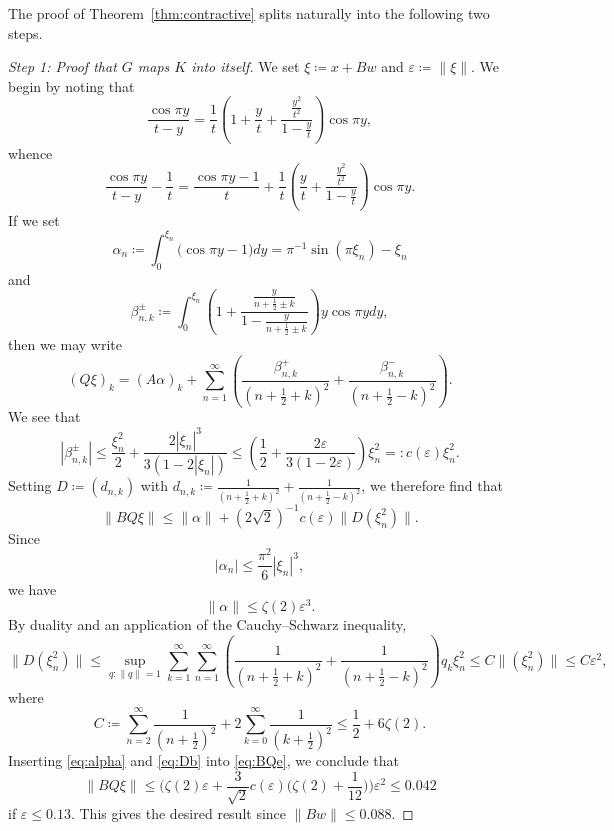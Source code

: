 \documentclass[12pt]{amsart}
\theoremstyle{plain}
\begin{document}
The proof of Theorem~\ref{thm:contractive} splits naturally into the following two steps. 
\begin{proof}[Step 1: Proof that $G$ maps $K$ into itself]
 We set $\xi\coloneqq x+Bw$ and $\varepsilon\coloneqq \|\xi\|$. We begin by noting that
\[ \frac{\cos\pi y}{t-y}=\frac{1}{t}\left(1+\frac{y}{t}+\frac{\frac{y^2}{t^2}}{1-\frac{y}{t}}\right)\cos\pi y, \]
whence
\[\frac{\cos\pi y}{t-y}-\frac{1}{t}=\frac{\cos \pi y-1}{t}+\frac{1}{t}\left(\frac{y}{t}+\frac{\frac{y^2}{t^2}}{1-\frac{y}{t}}\right)\cos\pi y. \]
If we set
\begin{equation}  \alpha_n\coloneqq \int_0^{\xi_n} \big(\cos \pi y-1\big) dy = 
\pi^{-1}\sin (\pi \xi_n)-\xi_n \end{equation}
and 
\[ \beta_{n,k}^{\pm}\coloneqq  \int_{0}^{\xi_n} \left(1+\frac{\frac{y}{n+\frac12\pm k}}{1-\frac{y}{n+\frac12\pm k}}\right)y\cos\pi y dy ,\] 
then we may write
\[ (Q\xi)_k = (A\alpha)_k + \sum_{n=1}^\infty \left(\frac{\beta_{n,k}^{+}}{(n+\frac12+k)^2} +\frac{\beta^{-}_{n,k}}{(n+\frac12-k)^2}\right). \]
We see that
\[ |\beta_{n,k}^{\pm}|\le \frac{\xi_n^2}{2}+\frac{2|\xi_n|^3}{3(1-2|\xi_n|)}\le \left(\frac12+\frac{2\varepsilon}{3(1-2\varepsilon)}\right) \xi_n^2=:c(\varepsilon) \xi_n^2. \] 
Setting $D\coloneqq (d_{n,k})$ with $d_{n,k}\coloneqq \frac{1}{(n+\frac12+k)^2} +\frac{1}{(n+\frac12-k)^2}$, we therefore find that
\begin{equation} \label{eq:BQe}  \| BQ \xi \| \le \| \alpha \| + (2\sqrt{2})^{-1} c(\varepsilon) \| D (\xi_n^2)\|.\end{equation}
Since
\[ |\alpha_n|\le \frac{\pi^2}{6} |\xi_n|^3 ,\]
we have
\begin{equation} \label{eq:alpha}  \| \alpha \|\le \zeta(2) \varepsilon^3. \end{equation}
By duality and an application of the Cauchy--Schwarz inequality,
\begin{equation}  \label{eq:Db} \|D (\xi_n^2) \|  \le \sup_{q:\|q\|=1} \sum_{k=1}^\infty \sum_{n=1}^\infty \left(\frac{1}{(n+\frac12+k)^2} +\frac{1}{(n+\frac12-k)^2} \right) q_k \xi_n^2  
    \le C \| (\xi_n^2) \| \le C \varepsilon^2, \end{equation}
   where 
   \[ C\coloneqq \sum_{n=2}^\infty \frac{1}{(n+\frac12)^2}+2\sum_{k=0}^\infty \frac{1}{(k+\frac12)^2} \le \frac{1}{2}+6\zeta(2).\]
   Inserting \eqref{eq:alpha} and \eqref{eq:Db} into \eqref{eq:BQe}, we conclude that
   \[  \| BQ \xi \| \le \Big(\zeta(2) \varepsilon + \frac{3}{\sqrt{2}} c(\varepsilon) \big(\zeta(2)+\frac{1}{12}\big)  \Big) \varepsilon^2 \le 0.042 \] 
   if $\varepsilon\le 0.13$. This gives the desired result since $\|Bw\|\le 0.088$.
 \end{proof}
\end{document}
